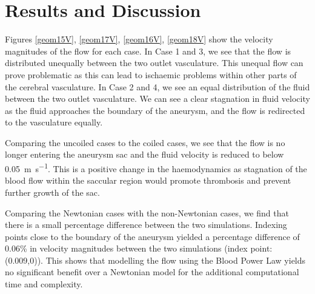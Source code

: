 \documentclass[journal,twoside,web]{ieeecolor}
\begin{document}
\section{Results and Discussion}
Figures \ref{geom15V}, \ref{geom17V}, \ref{geom16V}, \ref{geom18V} show the velocity magnitudes of the flow for each case. In Case 1 and 3, we see that the flow is distributed unequally between the two outlet vasculature. This unequal flow can prove problematic as this can lead to ischaemic problems within other parts of the cerebral vasculature. In Case 2 and 4, we see an equal distribution of the fluid between the two outlet vasculature. We can see a clear stagnation in fluid velocity as the fluid approaches the boundary of the aneurysm, and the flow is redirected to the vasculature equally.

Comparing the uncoiled cases to the coiled cases, we see that the flow is no longer entering the aneurysm sac and the fluid velocity is reduced to below \SI{0.05}{m\per \second}. This is a positive change in the haemodynamics as stagnation of the blood flow within the saccular region would promote thrombosis and prevent further growth of the sac.

Comparing the Newtonian cases with the non-Newtonian cases, we find that there is a small percentage difference between the two simulations. Indexing points close to the boundary of the aneurysm yielded a percentage difference of 0.06\% in velocity magnitudes between the two simulations (index point: (0.009,0)). This shows that modelling the flow using the Blood Power Law yields no significant benefit over a Newtonian model for the additional computational time and complexity.
\end{document}
